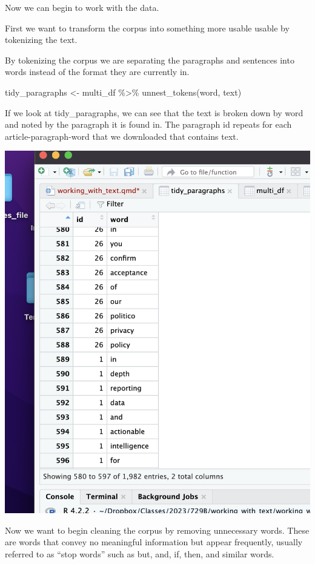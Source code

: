 \documentclass[
  letterpaper,
  DIV=11,
  numbers=noendperiod]{scrartcl}
\newenvironment{Shaded}{\begin{snugshade}}{\end{snugshade}}
\newcommand{\FunctionTok}[1]{\textcolor[rgb]{0.28,0.35,0.67}{#1}}
\newcommand{\NormalTok}[1]{\textcolor[rgb]{0.00,0.23,0.31}{#1}}
\newcommand{\OtherTok}[1]{\textcolor[rgb]{0.00,0.23,0.31}{#1}}
\newcommand{\SpecialCharTok}[1]{\textcolor[rgb]{0.37,0.37,0.37}{#1}}
\begin{document}
Now we can begin to work with the data.

First we want to transform the corpus into something more usable usable
by tokenizing the text.

By tokenizing the corpus we are separating the paragraphs and sentences
into words instead of the format they are currently in.

\begin{Shaded}
\begin{Highlighting}[]
\NormalTok{tidy\_paragraphs }\OtherTok{\textless{}{-}}\NormalTok{ multi\_df }\SpecialCharTok{\%\textgreater{}\%}
  \FunctionTok{unnest\_tokens}\NormalTok{(word, text)}
\end{Highlighting}
\end{Shaded}

If we look at tidy\_paragraphs, we can see that the text is broken down
by word and noted by the paragraph it is found in. The paragraph id
repeats for each article-paragraph-word that we downloaded that contains
text.

\includegraphics{Images/1.png}

Now we want to begin cleaning the corpus by removing unnecessary words.
These are words that convey no meaningful information but appear
frequently, usually referred to as ``stop words'' such as but, and, if,
then, and similar words.
\end{document}
